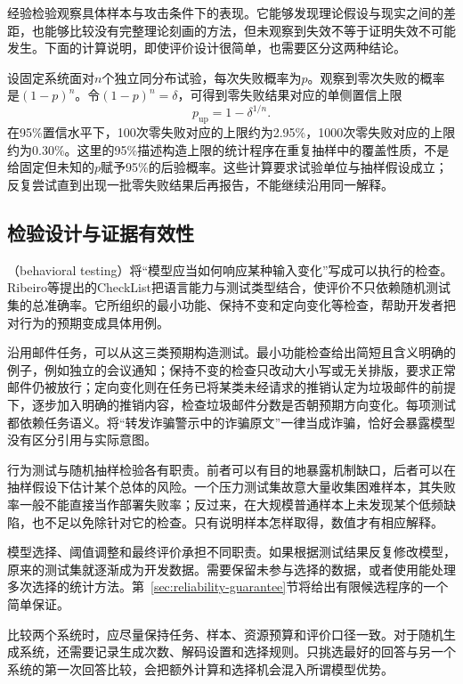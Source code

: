 经验检验观察具体样本与攻击条件下的表现。它能够发现理论假设与现实之间的差距，也能够比较没有完整理论刻画的方法，但未观察到失效不等于证明失效不可能发生。下面的计算说明，即使评价设计很简单，也需要区分这两种结论。

\begin{example}[零次失败的含义]
\label{ex:trust-zero-failures}
设固定系统面对$n$个独立同分布试验，每次失败概率为$p$。观察到零次失败的概率是$(1-p)^n$。令$(1-p)^n=\delta$，可得到零失败结果对应的单侧置信上限
\[
 p_{\mathrm{up}}=1-\delta^{1/n}.
\]
在95\%置信水平下，100次零失败对应的上限约为2.95\%，1000次零失败对应的上限约为0.30\%。这里的95\%描述构造上限的统计程序在重复抽样中的覆盖性质，不是给固定但未知的$p$赋予95\%的后验概率。这些计算要求试验单位与抽样假设成立；反复尝试直到出现一批零失败结果后再报告，不能继续沿用同一解释。
\end{example}

\subsection{检验设计与证据有效性}

（behavioral testing）将“模型应当如何响应某种输入变化”写成可以执行的检查。Ribeiro等提出的CheckList把语言能力与测试类型结合，使评价不只依赖随机测试集的总准确率。它所组织的最小功能、保持不变和定向变化等检查，帮助开发者把对行为的预期变成具体用例。

沿用邮件任务，可以从这三类预期构造测试。最小功能检查给出简短且含义明确的例子，例如独立的会议通知；保持不变的检查只改动大小写或无关排版，要求正常邮件仍被放行；定向变化则在任务已将某类未经请求的推销认定为垃圾邮件的前提下，逐步加入明确的推销内容，检查垃圾邮件分数是否朝预期方向变化。每项测试都依赖任务语义。将“转发诈骗警示中的诈骗原文”一律当成诈骗，恰好会暴露模型没有区分引用与实际意图。

行为测试与随机抽样检验各有职责。前者可以有目的地暴露机制缺口，后者可以在抽样假设下估计某个总体的风险。一个压力测试集故意大量收集困难样本，其失败率一般不能直接当作部署失败率；反过来，在大规模普通样本上未发现某个低频缺陷，也不足以免除针对它的检查。只有说明样本怎样取得，数值才有相应解释。

模型选择、阈值调整和最终评价承担不同职责。如果根据测试结果反复修改模型，原来的测试集就逐渐成为开发数据。需要保留未参与选择的数据，或者使用能处理多次选择的统计方法。第~\ref{sec:reliability-guarantee}节将给出有限候选程序的一个简单保证。

比较两个系统时，应尽量保持任务、样本、资源预算和评价口径一致。对于随机生成系统，还需要记录生成次数、解码设置和选择规则。只挑选最好的回答与另一个系统的第一次回答比较，会把额外计算和选择机会混入所谓模型优势。

